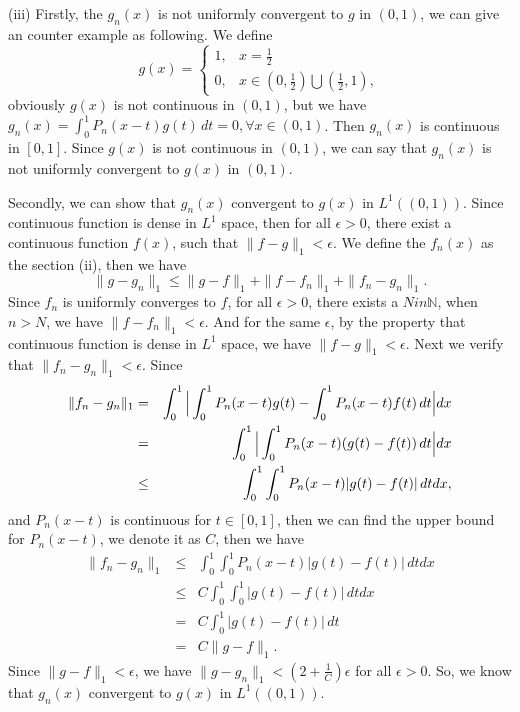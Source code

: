 \documentclass[12pt,a4paper]{ctexart}
\begin{document}
(iii) Firstly, the $g_{n}(x)$ is not uniformly convergent to $g$ in $(0, 1)$, we can give an counter example as following. We define 
\begin{equation*}
g(x) =
\left\{
             \begin{array}{cl}
             1, & x = \frac{1}{2} \\
             0, & x \in (0, \frac{1}{2}) \bigcup (\frac{1}{2}, 1),
             \end{array}
\right.
\end{equation*}
obviously $g(x)$ is not continuous in $(0, 1)$, but we have $g_{n} (x) = \int_{0}^{1} P_{n}(x -t)g(t) \, d t = 0, \forall x \in (0, 1)$. Then $g_{n} (x)$ is continuous in $[0, 1]$. Since $g(x)$ is not continuous in $(0, 1)$, we can say that $g_{n}(x)$ is not uniformly convergent to $g(x)$ in $(0, 1)$.

Secondly, we can show that $g_{n}(x)$ convergent to $g(x)$ in $L^{1}((0, 1))$. Since continuous function is dense in $L^{1}$ space, then for all $\epsilon > 0$, there exist a continuous function $f(x)$, such that $\|f- g \|_{1} < \epsilon$. We define the $f_{n}(x)$ as the section (ii), then we have
\begin{equation*}
\|g- g_{n} \|_{1} \leq  \|g- f \|_{1} + \|f- f_{n} \|_{1} + \|f_{n}- g_{n} \|_{1}.
\end{equation*}
Since $f_{n}$ is uniformly converges to $f$, for all $\epsilon > 0$, there exists a $N in \mathbb{N}$, when $n > N$, we have $\|f- f_{n} \|_{1} < \epsilon$. And for the same $\epsilon$, by the property that continuous function is dense in $L^{1}$ space, we have $\|f- g \|_{1} < \epsilon$. Next we verify that $\|f_{n}- g_{n} \|_{1} < \epsilon$. Since
\begin{eqnarray*}
\|f_{n}- g_{n} \|_{1} &=& \int_{0}^{1} \Big{|} \int_{0}^{1}  P_{n}(x-t) g(t) - \int_{0}^{1}  P_{n}(x-t) f(t) \, d t \Big{|} d x  \\
&=& \int_{0}^{1} \Big{|} \int_{0}^{1}  P_{n}(x-t) (g(t) - f(t)) \, d t \Big{|} d x  \\
&\leq& \int_{0}^{1}  \int_{0}^{1}  P_{n}(x-t) |g(t) - f(t)|\, d t  d x,
\end{eqnarray*}
and $P_{n}(x-t)$ is continuous for $t \in [0, 1]$, then we can find the upper bound for  $P_{n}(x-t)$, we denote it as $C$, then we have
\begin{eqnarray*}
\|f_{n}- g_{n} \|_{1} &\leq&  \int_{0}^{1}  \int_{0}^{1}  P_{n}(x-t) |g(t) - f(t)|\, d t  d x \\
&\leq&  C \int_{0}^{1}  \int_{0}^{1} |g(t) - f(t)|\, d t  d x \\
&=&  C \int_{0}^{1} |g(t) - f(t)|\, d t \\
&=& C \|g-f \|_{1}.
\end{eqnarray*}
Since $\|g-f \|_{1} < \epsilon$, we have $\|g-g_{n} \|_{1} < (2 + \frac{1}{C}) \epsilon$ for all $\epsilon > 0$. So, we know that $g_{n}(x)$ convergent to $g(x)$ in $L^{1}((0, 1))$.
\end{document}
